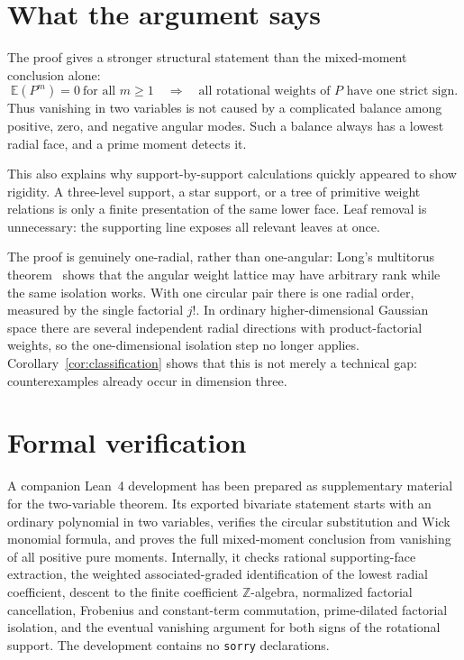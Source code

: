 \documentclass[11pt]{article}
\newcommand{\Z}{\mathbb Z}
\newcommand{\E}{\mathbb E}
\begin{document}
\section{What the argument says}

The proof gives a stronger structural statement than the mixed-moment
conclusion alone:
\[
  \E(P^m)=0\ \text{for all }m\geq1
  \quad\Longrightarrow\quad
  \text{all rotational weights of \(P\) have one strict sign.}
\]
Thus vanishing in two variables is not caused by a complicated balance
among positive, zero, and negative angular modes.  Such a balance always
has a lowest radial face, and a prime moment detects it.

This also explains why support-by-support calculations quickly appeared to
show rigidity.  A three-level support, a star support, or a tree of
primitive weight relations is only a finite presentation of the same lower
face.  Leaf removal is unnecessary: the supporting line exposes all
relevant leaves at once.

The proof is genuinely one-radial, rather than one-angular: Long's
multitorus theorem~\cite{LongTorus} shows that the angular weight lattice may
have arbitrary rank while the same isolation works.  With one circular pair
there is one radial order, measured by the single factorial \(j!\).  In
ordinary higher-dimensional Gaussian space there are several independent
radial directions with product-factorial weights, so the one-dimensional
isolation step no longer applies.
Corollary~\ref{cor:classification} shows that this is not merely a
technical gap: counterexamples already occur in dimension three.

\section{Formal verification}

A companion Lean~4 development has been prepared as supplementary material
for the two-variable theorem.  Its exported bivariate statement starts
with an ordinary polynomial in two variables, verifies the circular
substitution and Wick monomial formula, and proves the full mixed-moment
conclusion from vanishing of all positive pure moments.  Internally, it
checks rational supporting-face extraction, the weighted
associated-graded identification of the lowest radial coefficient, descent
to the finite coefficient \(\Z\)-algebra, normalized factorial
cancellation, Frobenius and constant-term commutation, prime-dilated
factorial isolation, and the eventual vanishing argument for both signs of
the rotational support.  The development contains no \texttt{sorry}
declarations.
\end{document}
